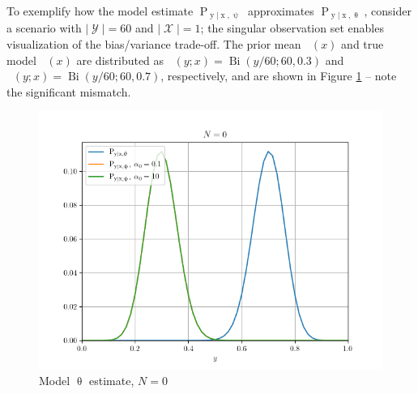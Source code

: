 \documentclass[12pt]{report}
\DeclareMathOperator{\xrm}{\mathrm{x}}
\DeclareMathOperator{\yrm}{\mathrm{y}}
\DeclareMathOperator{\Prm}{\mathrm{P}}
\DeclareMathOperator{\Xcal}{\mathcal{X}}
\DeclareMathOperator{\Ycal}{\mathcal{Y}}
\DeclareMathOperator{\Bi}{\mathrm{Bi}}
\DeclareMathOperator{\thetac}{\theta_\text{c}}
\DeclareMathOperator{\upthetac}{\uptheta_\text{c}}
\DeclareMathOperator{\alphac}{\alpha_\text{c}}
\begin{document}
To exemplify how the model estimate $\Prm_{\yrm | \xrm,\uppsi}$ approximates $\Prm_{\yrm | \xrm,\uptheta}$, consider a scenario with $|\Ycal| = 60$ and $|\Xcal| = 1$; the singular observation set enables visualization of the bias/variance trade-off. The prior mean $\alphac(x)$ and true model $\upthetac(x)$ are distributed as $\alphac(y;x) = \Bi(y/60; 60, 0.3)$ and $\thetac(y;x) = \Bi(y/60; 60, 0.7)$, respectively, and are shown in Figure \ref{fig:model_est/N_0} -- note the significant mismatch.
\begin{figure}
\centering
\includegraphics[width=0.8\linewidth]{model_est/N_0.png}
\caption{Model $\uptheta$ estimate, $N=0$}
\label{fig:model_est/N_0}
\end{figure}
\end{document}
